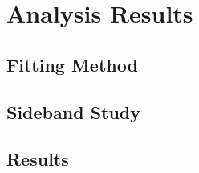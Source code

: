 \chapter{Analysis Results}
\label{ch:Results}

\section{Fitting Method}

\section{Sideband Study}

\section{Results}